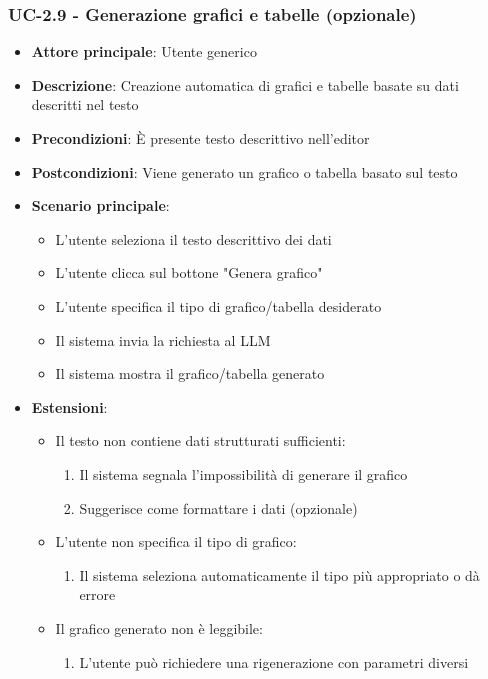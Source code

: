 \documentclass[11pt,a4paper]{article}
\begin{document}
\subsubsection{UC-2.9 - Generazione grafici e tabelle (opzionale)}
\begin{itemize}
    \item \textbf{Attore principale}: Utente generico
    \item \textbf{Descrizione}: Creazione automatica di grafici e tabelle basate su dati descritti nel testo
    \item \textbf{Precondizioni}: È presente testo descrittivo nell'editor
    \item \textbf{Postcondizioni}: Viene generato un grafico o tabella basato sul testo
    \item \textbf{Scenario principale}:
        \begin{itemize}
            \item L'utente seleziona il testo descrittivo dei dati
            \item L'utente clicca sul bottone "Genera grafico"
            \item L'utente specifica il tipo di grafico/tabella desiderato
            \item Il sistema invia la richiesta al LLM
            \item Il sistema mostra il grafico/tabella generato
        \end{itemize}
    \item \textbf{Estensioni}:
        \begin{itemize}
            \item Il testo non contiene dati strutturati sufficienti:
                \begin{enumerate}
                    \item Il sistema segnala l'impossibilità di generare il grafico
                    \item Suggerisce come formattare i dati (opzionale)
                \end{enumerate}
            \item L'utente non specifica il tipo di grafico:
                \begin{enumerate}
                    \item Il sistema seleziona automaticamente il tipo più appropriato o dà errore
                \end{enumerate}
            \item Il grafico generato non è leggibile:
                \begin{enumerate}
                    \item L'utente può richiedere una rigenerazione con parametri diversi
                \end{enumerate}
        \end{itemize}
\end{itemize}
\end{document}
